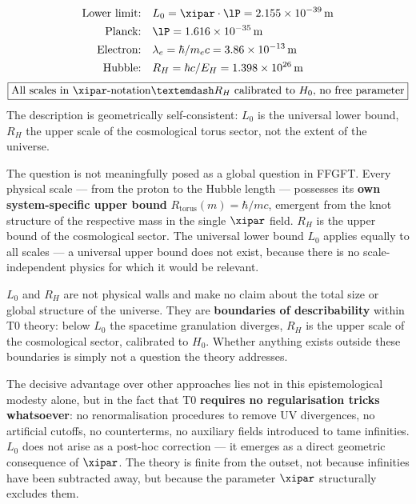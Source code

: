 \begin{keyresult}
\begin{align}
	\text{Lower limit:} \quad & L_0 = \xipar \cdot \lP = 2{.}155 \times 10^{-39}\,\text{m} \notag \\
	\text{Planck:} \quad & \lP = 1{.}616 \times 10^{-35}\,\text{m} \notag \\
	\text{Electron:} \quad & \lambda_e = \hbar/m_e c = 3{.}86 \times 10^{-13}\,\text{m} \notag \\
	\text{Hubble:} \quad & R_H = \hbar c/E_H = 1{.}398 \times 10^{26}\,\text{m} \notag
\end{align}
\begin{equation}
	\boxed{\text{All scales in } \xipar\text{-notation} — R_H \text{ calibrated to } H_0 \text{, no free parameter}}
\end{equation}
The description is geometrically self-consistent: $L_0$ is the universal lower bound, $R_H$ the upper scale of the cosmological torus sector, not the extent of the universe.

\begin{keyresult}
The question is not meaningfully posed as a global question in FFGFT. Every physical scale — from the proton to the Hubble length — possesses its \textbf{own system-specific upper bound} $R_\text{torus}(m) = \hbar/mc$, emergent from the knot structure of the respective mass in the single $\xipar$ field. $R_H$ is the upper bound of the cosmological sector. The universal lower bound $L_0$ applies equally to all scales — a universal upper bound does not exist, because there is no scale-independent physics for which it would be relevant.
\end{keyresult}
\end{keyresult}

\begin{foundation}
$L_0$ and $R_H$ are not physical walls and make no claim about the total size or global structure of the universe. They are \textbf{boundaries of describability} within T0 theory: below $L_0$ the spacetime granulation diverges, $R_H$ is the upper scale of the cosmological sector, calibrated to $H_0$. Whether anything exists outside these boundaries is simply not a question the theory addresses.

The decisive advantage over other approaches lies not in this epistemological modesty alone, but in the fact that T0 \textbf{requires no regularisation tricks whatsoever}: no renormalisation procedures to remove UV divergences, no artificial cutoffs, no counterterms, no auxiliary fields introduced to tame infinities. $L_0$ does not arise as a post-hoc correction — it emerges as a direct geometric consequence of $\xipar$. The theory is finite from the outset, not because infinities have been subtracted away, but because the parameter $\xipar$ structurally excludes them.
\end{foundation}

